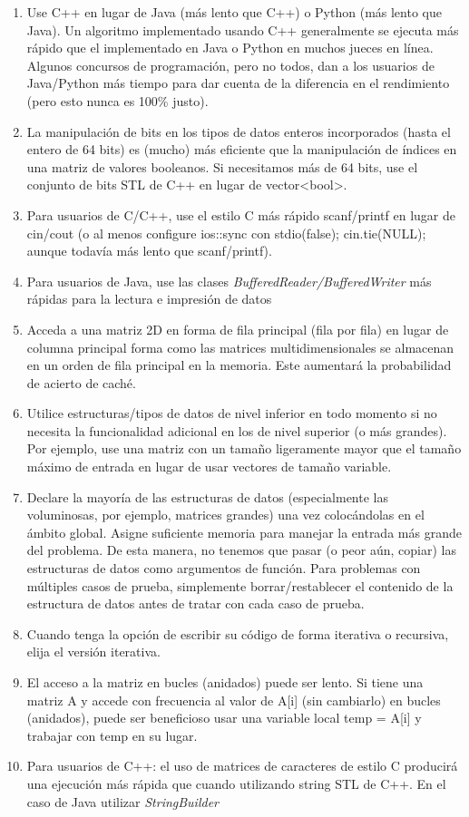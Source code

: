 \begin{enumerate}
	\item  Use C++ en lugar de Java (más lento que C++) o Python (más lento
	que Java). Un algoritmo implementado usando C++ generalmente se ejecuta más rápido que el
	implementado en Java o Python en muchos jueces en línea. Algunos concursos de programación, pero no todos, dan a los usuarios de Java/Python más tiempo para dar cuenta de la diferencia en el rendimiento (pero esto nunca es 100\% justo).
	\item La manipulación de bits en los tipos de datos enteros incorporados (hasta el entero de 64 bits) es (mucho) más eficiente que la manipulación de índices en una matriz de valores booleanos. Si necesitamos más de 64 bits, use el conjunto de bits STL de C++ en lugar de vector<bool>.
	\item Para usuarios de C/C++, use el estilo C más rápido scanf/printf en lugar de cin/cout (o
	al menos configure ios::sync con stdio(false); cin.tie(NULL); aunque todavía más lento que scanf/printf).
	\item Para usuarios de Java, use las clases \emph{BufferedReader/BufferedWriter} más rápidas para la lectura e impresión de datos
	\item Acceda a una matriz 2D en forma de fila principal (fila por fila) en lugar de columna principal forma como las matrices multidimensionales se almacenan en un orden de fila principal en la memoria. Este aumentará la probabilidad de acierto de caché.
	\item Utilice estructuras/tipos de datos de nivel inferior en todo momento si no necesita la funcionalidad adicional en los de nivel superior (o más grandes). Por ejemplo, use una matriz con un tamaño ligeramente mayor que el tamaño máximo de entrada en lugar de usar vectores de tamaño variable.
	\item Declare la mayoría de las estructuras de datos (especialmente las voluminosas, por ejemplo, matrices grandes) una vez colocándolas en el ámbito global. Asigne suficiente memoria para manejar la entrada más grande del problema. De esta manera, no tenemos que pasar (o peor aún, copiar) las estructuras de datos como argumentos de función. Para problemas con múltiples casos de prueba, simplemente borrar/restablecer el contenido de la estructura de datos antes de tratar con cada caso de prueba.
	\item Cuando tenga la opción de escribir su código de forma iterativa o recursiva, elija el
	versión iterativa.
	\item El acceso a la matriz en bucles (anidados) puede ser lento. Si tiene una matriz A y accede con frecuencia al valor de A[i] (sin cambiarlo) en bucles (anidados), puede ser beneficioso usar una variable local temp = A[i] y trabajar con temp en su lugar.
	\item Para usuarios de C++: el uso de matrices de caracteres de estilo C producirá una ejecución más rápida que cuando utilizando string STL de C++. En el caso de Java utilizar \emph{StringBuilder} 
\end{enumerate}



